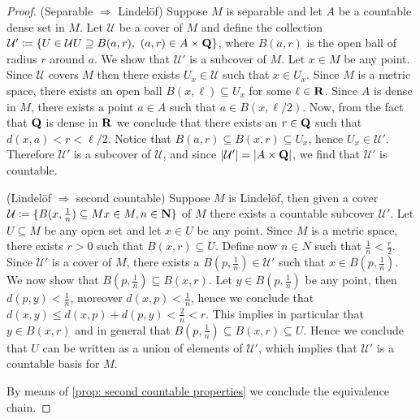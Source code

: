 \begin{proof}
    (Separable \(\Rightarrow\) Lindelöf) Suppose \(M\) is separable and let \(A\)
    be a countable dense set in \(M\). Let \(\mathcal U\) be a cover of \(M\) and
    define the collection \(\mathcal U' \coloneq \{U \in \mathcal U \relax U
    \supseteq B(a, r),\ (a, r) \in A \times \mathbf{Q}\}\), where \(B(a,r)\) is the open
    ball of radius \(r\) around \(a\). We show that \(\mathcal U'\) is a subcover of
    \(M\).  Let \(x \in M\) be any point. Since \(\mathcal U\) covers \(M\) then
    there exists \(U_x \in \mathcal U\) such that \(x \in U_x\). Since \(M\) is a
    metric space, there exists an open ball \(B(x, \ell) \subseteq U_x\) for some
    \(\ell \in \mathbf{R}\).  Since \(A\) is dense in \(M\), there exists a point \(a \in
    A\) such that \(a \in B(x, \ell/2)\). Now, from the fact that \(\mathbf{Q}\) is dense in
    \(\mathbf{R}\) we conclude that there exists an \(r \in \mathbf{Q}\) such that \(d(x, a) < r <
    \ell/2\). Notice that \(B(a, r) \subseteq B(x, r) \subseteq U_x\), hence \(U_x
    \in \mathcal U'\). Therefore \(\mathcal U'\) is a subcover of \(\mathcal U\),
    and since \(|\mathcal U'| = |A \times \mathbf{Q}|\), we find that \(\mathcal U'\) is
    countable.

    (Lindelöf \(\Rightarrow\) second countable) Suppose \(M\) is Lindelöf, then
    given a cover \(\mathcal U \coloneq \{B(x, \frac{1}{n}) \subseteq M \relax x \in M, n
    \in \mathbf{N}\}\) of \(M\) there exists a countable subcover \(\mathcal U'\). Let \(U
    \subseteq M\) be any open set and let \(x \in U\) be any point. Since \(M\) is a
    metric space, there exists \(r > 0\) such that \(B(x, r) \subseteq U\). Define
    now \(n \in N\) such that \(\frac 1 n < \frac r 2\). Since \(\mathcal U'\) is a
    cover of \(M\), there exists a \(B(p, \frac 1 n) \in \mathcal U'\) such that \(x
    \in B(p, \frac 1 n)\). We now show that \(B(p, \frac 1 n) \subseteq B(x,
    r)\). Let \(y \in B(p, \frac 1 n)\) be any point, then \(d(p, y) < \frac 1 n\),
    moreover \(d(x, p) < \frac 1 n\), hence we conclude that \(d(x, y) \leq d(x, p)
    + d(p, y) < \frac 2 n < r\). This implies in particular that \(y \in B(x, r)\)
    and in general that \(B(p, \frac 1 n) \subseteq B(x, r) \subseteq U\). Hence we
    conclude that \(U\) can be written as a union of elements of \(\mathcal U'\),
    which implies that \(\mathcal U'\) is a countable basis for \(M\).

    By means of \cref{prop: second countable properties} we conclude the
    equivalence chain.
\end{proof}

